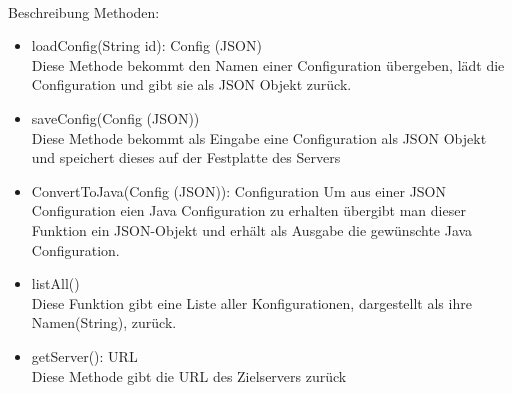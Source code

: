 \ \\
Beschreibung Methoden:\\
\begin{itemize}
	\item loadConfig(String id): Config (JSON) \\
	Diese Methode bekommt den Namen einer Configuration übergeben, lädt die Configuration und gibt sie als JSON Objekt zurück.
	
	\item saveConfig(Config (JSON))\\
	Diese Methode bekommt als Eingabe eine Configuration als JSON Objekt
	und speichert dieses auf der Festplatte des Servers
	
	\item ConvertToJava(Config (JSON)): Configuration
	Um aus einer JSON Configuration eien Java Configuration zu erhalten übergibt man dieser Funktion ein JSON-Objekt und erhält als Ausgabe die gewünschte Java Configuration.
	
	\item listAll() \\
	Diese Funktion gibt eine Liste aller Konfigurationen, dargestellt als ihre Namen(String), zurück.
	
	\item getServer(): URL\\
	Diese Methode gibt die URL des Zielservers zurück 
\end{itemize}
